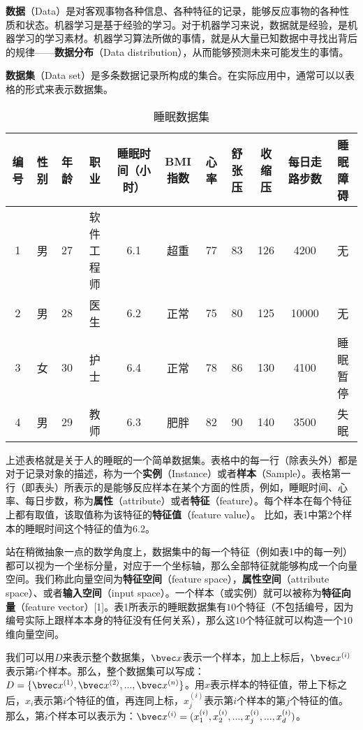 

\textbf{数据}（Data）是对客观事物各种信息、各种特征的记录，能够反应事物的各种性质和状态。机器学习是基于经验的学习。对于机器学习来说，数据就是经验，是机器学习的学习素材。机器学习算法所做的事情，就是从大量已知数据中寻找出背后的规律——\textbf{数据分布}（Data distribution），从而能够预测未来可能发生的事情。

\textbf{数据集}（Data set）是多条数据记录所构成的集合。在实际应用中，通常可以以表格的形式来表示数据集。

\begin{table}[ht]
\centering
\caption{睡眠数据集}\label{tab_datast2}
\begin{tabular}{|c|c|c|c|c|c|c|c|c|c|c|}
\hline
编号 & 性别 & 年龄 & 职业 & 睡眠时间（小时） & BMI指数 & 心率 & 舒张压 & 收缩压 & 每日走路步数 & 睡眠障碍 \\\hline
1 & 男 & 27 & 软件工程师 & 6.1 & 超重 & 77 & 83 & 126 & 4200 & 无 \\
\hline
2 & 男 & 28 & 医生 & 6.2 & 正常 & 75 & 80 & 125 & 10000 & 无 \\
\hline
3 & 女 & 30 & 护士 & 6.4 & 正常 & 78 & 86 & 130 & 4100 & 睡眠暂停 \\
\hline
4 & 男 & 29 & 教师 & 6.3 & 肥胖 & 82 & 90 & 140 & 3500 & 失眠 \\
\hline
\end{tabular}
\end{table}

上述表格就是关于人的睡眠的一个简单数据集。表格中的每一行（除表头外）都是对于记录对象的描述，称为一个\textbf{实例}（Instance）或者\textbf{样本}（Sample）。表格第一行（即表头）所表示的是能够反应样本在某个方面的性质，例如，睡眠时间、心率、每日步数，称为\textbf{属性}（attribute）或者\textbf{特征}（feature）。每个样本在每个特征上都有取值，该取值称为该特征的\textbf{特征值}（feature value）。
比如，表1中第2个样本的睡眠时间这个特征的值为6.2。

站在稍微抽象一点的数学角度上，数据集中的每一个特征（例如表1中的每一列）都可以视为一个坐标分量，对应于一个坐标轴，那么全部特征就能够构成一个向量空间。我们称此向量空间为\textbf{特征空间}（feature space），\textbf{属性空间}（attribute space）、或者\textbf{输入空间}（input space）。一个样本（或实例）就可以被称为\textbf{特征向量}（feature vector）[1]。表1所表示的睡眠数据集有$10$个特征（不包括编号，因为编号实际上跟样本本身的特征没有任何关系），那么这$10$个特征就可以构造一个$10$维向量空间。

我们可以用$D$来表示整个数据集，$\bvec x$表示一个样本，加上上标后，$\bvec x^{(i)}$表示第$i$个样本。那么，整个数据集可以写成：$D=\{\bvec x^{(1)}, \bvec x^{(2)}, ..., \bvec x^{(n)}\}$。用$x$表示样本的特征值，带上下标之后，$x_i$表示第$i$个特征的值，再连同上标，$x^{(i)}_j$表示第$i$个样本的第$j$个特征的值。那么，第$i$个样本可以表示为：$\bvec x^{(i)}=(x^{(i)}_1, x^{(i)}_2, ..., x^{(i)}_j, ..., x^{(i)}_d)$。

